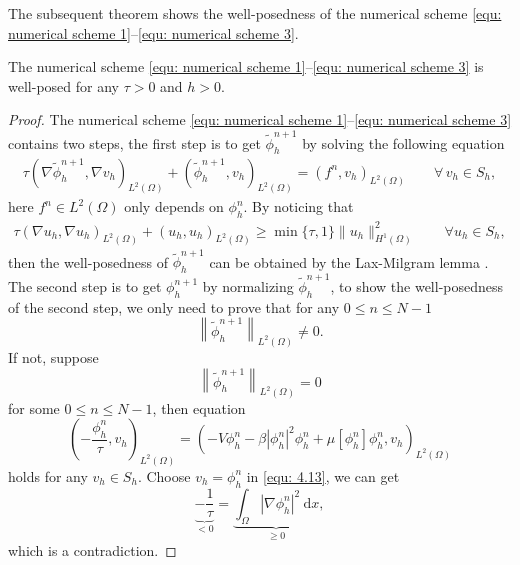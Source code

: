 \documentclass{siamart250211}
\begin{document}
The subsequent theorem shows the well-posedness of the numerical scheme \eqref{equ: numerical scheme 1}--\eqref{equ: numerical scheme 3}.
\begin{theorem}
	The numerical scheme \eqref{equ: numerical scheme 1}--\eqref{equ: numerical scheme 3} is well-posed for any $\tau >0$ and $h > 0$.
\end{theorem}
\begin{proof}
The numerical scheme \eqref{equ: numerical scheme 1}--\eqref{equ: numerical scheme 3} contains two steps, the first step is to get $\tilde{\phi}_h^{n+1}$ by solving the following equation
\begin{align*}
    \tau(\nabla \tilde{\phi}_h^{n+1}, \nabla v_h)_{L^2(\Omega)} + ( \tilde{\phi}_h^{n+1}, v_h)_{L^2(\Omega)} = (f^n,v_h)_{L^2(\Omega)} \qquad \forall\, v_h \in S_h,
\end{align*}
here $f^n \in L^2(\Omega)$ only depends on $\phi_h^n$. By noticing that
\begin{align*}
    \tau(\nabla u_h, \nabla u_h)_{L^2(\Omega)} + ( u_h, u_h)_{L^2(\Omega)} \ge \min\{ \tau,1 \}\|u_h\|_{H^1(\Omega)}^2 \qquad \forall u_h \in S_h,
\end{align*}
then the well-posedness of $\tilde{\phi}_h^{n+1}$ can be obtained by the Lax-Milgram lemma \cite{brenner2008mathematical}.
The second step is to get $\phi^{n+1}_h$ by normalizing $\tilde{\phi}_h^{n+1}$, to show the well-posedness of the second step, we only need to prove that for any $0 \le n \le N-1$  
	\begin{equation*}
		\left\| \tilde{\phi}_h^{n+1}  \right\|_{L^2(\Omega)} \neq 0.
	\end{equation*}
	If not, suppose 
	\begin{equation*}
		\left\| \tilde{\phi}_h^{n+1}  \right\|_{L^2(\Omega)} = 0
	\end{equation*}
	for some $0 \le n \le N-1$, then equation
	\begin{equation}\label{equ: 4.13}
		\left( -\frac{     \phi_h^{n} }{\tau}, v_h \right)_{L^2(\Omega)} = \left( - V \phi_h^{n}  - \beta|\phi_h^{n}|^2  \phi_h^{n}  + \mu[\phi_h^{n}]  \phi_h^{n} ,v_h \right)_{L^2(\Omega)} 
	\end{equation}
    holds for any $v_h \in S_h$. Choose $ v_h =  \phi_h^{n} $ in \eqref{equ: 4.13}, we can get 
	\begin{equation*}
	 \underbrace{- \frac{1}{\tau}}_{<0} = \underbrace{\int_{\Omega} |\nabla \phi_h^n|^2 \ \text{d}x}_{\ge 0},
	\end{equation*}
	which is a contradiction.
\end{proof}
\end{document}
